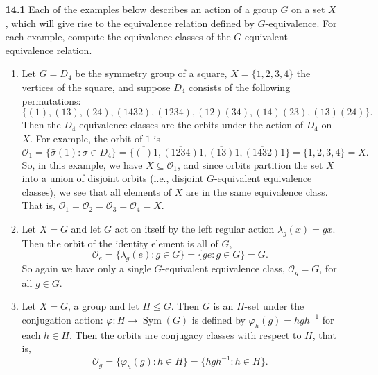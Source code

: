 \documentclass[12pt,reqno]{amsart}
\newcommand{\<}{\ensuremath{\langle}}
\renewcommand{\>}{\ensuremath{\rangle}}
\newcommand{\Sym}{\ensuremath{\operatorname{Sym}}}
\begin{document}
\begin{enumerate}
\item[{\bf 14.1}] Each of the examples below describes an action of a group $G$
  on a set $X$, which will give rise to the equivalence relation defined by
  $G$-equivalence.  For each example, compute the equivalence classes of the
  $G$-equivalent equivalence relation.  

\medskip
{}

\begin{enumerate}
\item
Let $G = D_4$ be the symmetry group of a square, $X = \{ 1, 2, 3, 4 \}$ the
vertices of the square, and suppose $D_4$ consists of the following permutations: 
\[
\{ (1), (13), (24), (1432), (1234), (12)(34), (14)(23), (13)(24) \}.
\]
Then the $D_4$-equivalence classes are the orbits under the action of $D_4$ on
$X$.  For example, the orbit of $1$ is 
\[
\mathcal{O}_1 = 
\{\bar{\sigma} (1) : \sigma \in D_4\} = 
\{\overline{(~)} 1, 
\overline{(1234)} 1,
\overline{(13)} 1, \overline{(1432)} 1\} = \{1, 2, 3, 4\} = X.
\]
So, in this example, we have $X \subseteq \mathcal{O}_1$, and since orbits partition the set $X$
into a union of disjoint orbits (i.e., disjoint $G$-equivalent equivalence
classes), we see that all elements of $X$ are in the same equivalence class.
That is,  $\mathcal{O}_1 = \mathcal{O}_2 = \mathcal{O}_3 = \mathcal{O}_4 = X$.
 
 \medskip

\item 
Let $X = G$ and let $G$ act on itself by the
left regular action $\lambda_g(x) = gx$. Then the orbit of the identity element
is all of $G$,
\[\mathcal{O}_e = \{\lambda_g(e) : g\in G\} = \{ge : g\in G\} = G.\]
So again we have only a single $G$-equivalent equivalence class,
$\mathcal{O}_g = G$, for all $g\in G$.
 
 \medskip

\item
Let $X=G$, a group and let $H\leq G$. Then $G$ is an $H$-set under 
the conjugation action:
$\varphi: H \rightarrow \Sym(G)$ is defined by
$\varphi_h(g) = hgh^{-1}$ for each $h\in H$.  Then the orbits are conjugacy
classes with respect to $H$, that is,
\[
\mathcal{O}_g = \{\varphi_h(g) : h \in H\} = \{hgh^{-1} : h \in H\}.
\]
 

\end{enumerate}
\end{enumerate}
\end{document}
